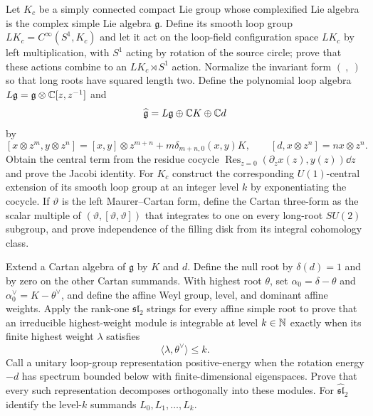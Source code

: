 \begin{exercise}
Let $K_c$ be a simply connected compact Lie group whose complexified Lie
algebra is the complex simple Lie algebra $\mathfrak g$.  Define its smooth
loop group $LK_c=C^\infty(S^1,K_c)$ and let it act on the loop-field
configuration space $LK_c$ by left multiplication, with $S^1$ acting by
rotation of the source circle; prove that these actions combine to an
$LK_c\rtimes S^1$ action.  Normalize the invariant
form $(\ ,\ )$ so that long roots have squared length two.  Define the
polynomial loop algebra $L\mathfrak g=\mathfrak g\otimes\mathbb C[z,z^{-1}]$ and
\[
 \widehat{\mathfrak g}=L\mathfrak g\oplus\mathbb C K\oplus\mathbb C d
\]
by
\[
 [x\otimes z^m,y\otimes z^n]
 =[x,y]\otimes z^{m+n}+m\delta_{m+n,0}(x,y)K,
 \qquad [d,x\otimes z^n]=n x\otimes z^n.
\]
Obtain the central term from the residue cocycle
$\operatorname{Res}_{z=0}(\partial_zx(z),y(z))\dd z$ and prove the Jacobi
identity.  For $K_c$ construct the corresponding $U(1)$-central extension of
its smooth loop group at an integer
level $k$ by exponentiating the cocycle.  If $\vartheta$ is the left
Maurer--Cartan form, define the Cartan three-form as the scalar multiple of
$(\vartheta,[\vartheta,\vartheta])$ that integrates to one on every long-root
$SU(2)$ subgroup, and prove independence of the filling disk from its integral
cohomology class.
\end{exercise}

\begin{exercise}
Extend a Cartan algebra of $\mathfrak g$ by $K$ and $d$.  Define the null
root by $\delta(d)=1$ and by zero on the other Cartan summands.  With highest
root $\theta$, set
$\alpha_0=\delta-\theta$ and $\alpha_0^\vee=K-\theta^\vee$, and define the
affine Weyl group, level, and dominant affine weights.  Apply the
rank-one $\mathfrak{sl}_2$ strings for every affine simple root to prove that
an irreducible highest-weight module is integrable at level $k\in\mathbb N$ exactly
when its finite highest weight $\lambda$ satisfies
\[
 \langle\lambda,\theta^\vee\rangle\leq k.
\]
Call a unitary loop-group representation positive-energy when the rotation
energy $-d$ has spectrum bounded below with finite-dimensional eigenspaces.
Prove that every such representation decomposes orthogonally into these
modules.  For
$\widehat{\mathfrak{sl}}_2$ identify the level-$k$ summands
$L_0,L_1,\ldots,L_k$.
\end{exercise}

